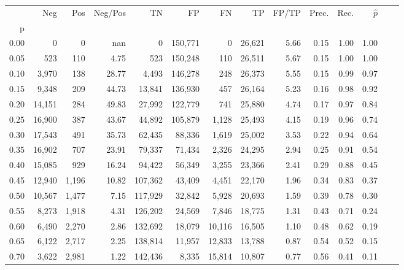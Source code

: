 \begin{tabular}{rrrrrrrrrrrrrr}
\toprule
{} &     Neg &    Pos & Neg/Pos &       TN &       FP &      FN &      TP & FP/TP & Prec. &  Rec. & $\hat{p}$ \\
p    &         &        &         &          &          &         &         &       &       &       &           \\
\midrule
0.00 &       0 &      0 &     nan &        0 &  150,771 &       0 &  26,621 &  5.66 &  0.15 &  1.00 &      1.00 \\
0.05 &     523 &    110 &    4.75 &      523 &  150,248 &     110 &  26,511 &  5.67 &  0.15 &  1.00 &      1.00 \\
0.10 &   3,970 &    138 &   28.77 &    4,493 &  146,278 &     248 &  26,373 &  5.55 &  0.15 &  0.99 &      0.97 \\
0.15 &   9,348 &    209 &   44.73 &   13,841 &  136,930 &     457 &  26,164 &  5.23 &  0.16 &  0.98 &      0.92 \\
0.20 &  14,151 &    284 &   49.83 &   27,992 &  122,779 &     741 &  25,880 &  4.74 &  0.17 &  0.97 &      0.84 \\
0.25 &  16,900 &    387 &   43.67 &   44,892 &  105,879 &   1,128 &  25,493 &  4.15 &  0.19 &  0.96 &      0.74 \\
0.30 &  17,543 &    491 &   35.73 &   62,435 &   88,336 &   1,619 &  25,002 &  3.53 &  0.22 &  0.94 &      0.64 \\
0.35 &  16,902 &    707 &   23.91 &   79,337 &   71,434 &   2,326 &  24,295 &  2.94 &  0.25 &  0.91 &      0.54 \\
0.40 &  15,085 &    929 &   16.24 &   94,422 &   56,349 &   3,255 &  23,366 &  2.41 &  0.29 &  0.88 &      0.45 \\
0.45 &  12,940 &  1,196 &   10.82 &  107,362 &   43,409 &   4,451 &  22,170 &  1.96 &  0.34 &  0.83 &      0.37 \\
0.50 &  10,567 &  1,477 &    7.15 &  117,929 &   32,842 &   5,928 &  20,693 &  1.59 &  0.39 &  0.78 &      0.30 \\
0.55 &   8,273 &  1,918 &    4.31 &  126,202 &   24,569 &   7,846 &  18,775 &  1.31 &  0.43 &  0.71 &      0.24 \\
0.60 &   6,490 &  2,270 &    2.86 &  132,692 &   18,079 &  10,116 &  16,505 &  1.10 &  0.48 &  0.62 &      0.19 \\
0.65 &   6,122 &  2,717 &    2.25 &  138,814 &   11,957 &  12,833 &  13,788 &  0.87 &  0.54 &  0.52 &      0.15 \\
0.70 &   3,622 &  2,981 &    1.22 &  142,436 &    8,335 &  15,814 &  10,807 &  0.77 &  0.56 &  0.41 &      0.11 \\

\end{tabular}
